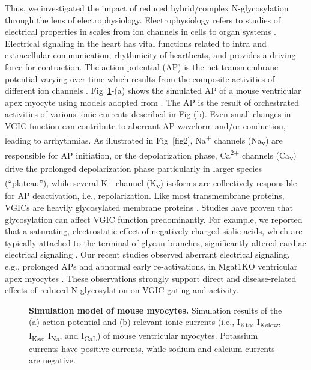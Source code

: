 \documentclass[10pt,letterpaper]{article}
\begin{document}
Thus, we investigated the impact of reduced hybrid/complex N-glycosylation through the lens of electrophysiology. Electrophysiology refers to studies of electrical properties in scales from ion channels in cells to organ systems \cite{scanziani2009electrophysiology}. Electrical signaling in the heart has vital functions related to intra and extracellular communication, rhythmicity of heartbeats, and provides a driving force for contraction. The action potential (AP) is the net transmembrane potential varying over time which results from the composite activities of different ion channels \cite{grant2009cardiac}. Fig~\ref{fig1}-(a) shows the simulated AP of a mouse ventricular apex myocyte using models adopted from \cite{bondarenko2004computer}. The AP is the result of orchestrated activities of various ionic currents described in Fig-(b). Even small changes in VGIC function can contribute to aberrant AP waveform and/or conduction, leading to arrhythmias. As illustrated in Fig~\ref{fig2}, Na\textsuperscript{+} channels (Na\textsubscript{v}) are responsible for AP initiation, or the depolarization phase, Ca\textsuperscript{2+} channels (Ca\textsubscript{v}) drive the prolonged depolarization phase particularly in larger species (“plateau”), while several K\textsuperscript{+} channel (K\textsubscript{v}) isoforms are collectively responsible for AP deactivation, i.e., repolarization. Like most transmembrane proteins, VGICs are heavily glycosylated membrane proteins \cite{ednie2011modulation}. Studies have proven that glycosylation can affect VGIC function predominantly. For example, we reported that a saturating, electrostatic effect of negatively charged sialic acids, which are typically attached to the terminal of glycan branches, significantly altered cardiac electrical signaling \cite{ednie2013expression, ednie2015reduced}. Our recent studies observed aberrant electrical signaling, e.g., prolonged APs and abnormal early re-activations, in Mgat1KO ventricular apex myocytes \cite{ednie2019reduced, ednie2019reduced2}. These observations strongly support direct and disease-related effects of reduced N-glycosylation on VGIC gating and activity.

\begin{figure}[!ht]
    \centering
    \caption{{\bf Simulation model of mouse myocytes.} 
    Simulation results of the (a) action potential and (b) relevant ionic currents (i.e., I\textsubscript{Kto}, I\textsubscript{Kslow}, I\textsubscript{Kss}, I\textsubscript{Na}, and I\textsubscript{CaL}) of mouse ventricular myocytes. Potassium currents have positive currents, while sodium and calcium currents are negative.}
    \label{fig1}
\end{figure}
\end{document}
